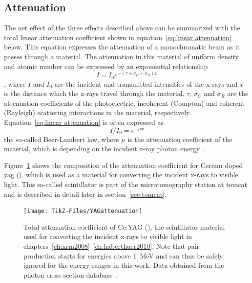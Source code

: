 \subsection{Attenuation}
The net effect of the three effects described above can be summarized with the total linear attenuation coefficient shown in equation~\ref{eq:linear attenuation} below. This equation expresses the attenuation of a monochromatic beam as it passes through a material. The attenuation in this material of uniform density and atomic number can be expressed by an exponential relationship%
\begin{equation}%
	I=I_{0}e^{-(\tau+\sigma_{C}+\sigma_{R})x}%
	\label{eq:linear attenuation}%
\end{equation}%
, where $I$ and $I_{0}$ are the incident and transmitted intensities of the x-rays and $x$ is the distance which the x-rays travel through the material. $\tau$, $\sigma_{C}$ and $\sigma_{R}$ are the attenuation coefficients of the photoelectric, incoherent (Compton) and coherent (Rayleigh) scattering interactions in the material, respectively. Equation~\ref{eq:linear attenuation} is often expressed as
\begin{equation}
	I/I_{0}=e^{-\mu x}
	\label{eq:beer-lambert}
\end{equation}%
the so-called Beer-Lambert law, where $\mu$ is the attenuation coefficient of the material, which is depending on the incident x-ray photon energy~\cite{Hsieh2003}. 

Figure~\ref{fig:yag attenuation} shows the composition of the attenuation coefficient for Cerium doped \ac{yag} (), which is used as a material for converting the incident x-rays to visible light. This so-called scintillator is part of the microtomography station at \ac{tomcat} and is described in detail later in section~\ref{sec:tomcat}.

\begin{figure}[htb]
	\centering
	\texttt{[image: TikZ-Files/YAGattenuation]}
	\caption{Total attenuation coefficient of Ce:YAG (), the scintillator material used for converting the incident x-rays to visible light in chapters~\ref{ch:xrm2008}--\ref{ch:haberthuer2010}. Note that pair production starts for energies above \SI{1}{\mega\electronvolt} and can thus be safely ignored for the energy-ranges in this work. Data obtained from the photon cross section database~\cite{XCOM}.}
	\label{fig:yag attenuation}
\end{figure}

